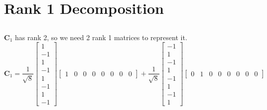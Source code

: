 \documentclass[]{article}
\begin{document}
\section{Rank 1 Decomposition}

\subsection{}

\(\bm{C}_1\) has rank 2, so we need 2 rank 1 matrices to represent it.
\begin{equation}
	\bm{C}_1 = \frac{1}{\sqrt{8}} \begin{bmatrix}
	1 \\
	-1 \\
	1 \\
	-1 \\
	1 \\
	-1 \\
	1 \\
	-1
	\end{bmatrix} \begin{bmatrix}
	1 & 0 & 0 & 0 & 0 & 0 & 0 & 0
	\end{bmatrix}
	+
	\frac{1}{\sqrt{8}} \begin{bmatrix}
	-1 \\
	1 \\
	-1 \\
	1 \\
	-1 \\
	1 \\
	-1 \\
	1
	\end{bmatrix} \begin{bmatrix}
	0 & 1 & 0 & 0 & 0 & 0 & 0 & 0
	\end{bmatrix}
\end{equation}

\subsection{}
\end{document}
